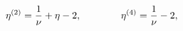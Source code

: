 \begin{equation}
\eta^{(2)} = {1 \over \nu} + \eta - 2, 
\qquad \qquad \eta^{(4)} = {1 \over \nu} - 2,  
\label{eq:9}
\end{equation}


